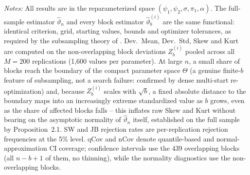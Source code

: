 \begin{table}[htbp]
\centering
\caption{Subsampling results (reparameterized) for $n = 500$ ($b = 62$, $N_b = 8$, $M = 200$)}
\label{tab:subsampling_n500}
\begin{flushleft}
\footnotesize\textit{Notes:} All results are in the reparameterized space $(\psi_1, \psi_2, \sigma, \pi_1, \alpha)$.  The full-sample estimator $\hat{\vartheta}_n$ and every block estimator $\hat{\vartheta}^{(i)}_b$ are the same functional: identical criterion, grid, starting values, bounds and optimizer tolerances, as required by the subsampling theory of \cite{PR94}.  Dev.~Mean, Dev.~Std, Skew and Kurt are computed on the non-overlapping block deviations $Z^{(i)}_b$ pooled across all $M = 200$ replications (1{,}600 values per parameter).  At large $n$, a small share of blocks reach the boundary of the compact parameter space $\Theta$ (a genuine finite-$b$ feature of subsampling, not a search failure: confirmed by dense multi-start re-optimization) and, because $Z^{(i)}_b$ scales with $\sqrt{b}$, a fixed absolute distance to the boundary maps into an increasingly extreme standardized value as $b$ grows, even as the share of affected blocks falls -- this inflates raw Skew and Kurt without bearing on the asymptotic normality of $\hat\vartheta_n$ itself, established on the full sample by Proposition~2.1.  SW and JB rejection rates are per-replication rejection frequencies at the 5\% level.  qCov and nCov denote quantile-based and normal-approximation CI coverage; confidence intervals use the 439 overlapping blocks (all $n - b + 1$ of them, no thinning), while the normality diagnostics use the non-overlapping blocks.
\end{flushleft}
\end{table}


